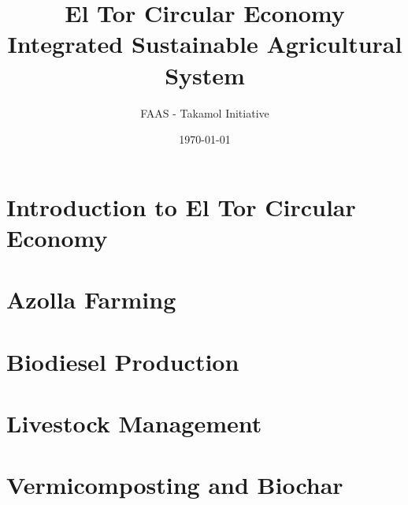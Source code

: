 \documentclass[12pt,a4paper]{report}
\title{El Tor Circular Economy\\
\large Integrated Sustainable Agricultural System}
\author{FAAS - Takamol Initiative}
\date{\today}
\begin{document}
\maketitle
\tableofcontents

\chapter{Introduction to El Tor Circular Economy}


\chapter{Azolla Farming}









\chapter{Biodiesel Production}









\chapter{Livestock Management}









\chapter{Vermicomposting and Biochar}








\end{document}
